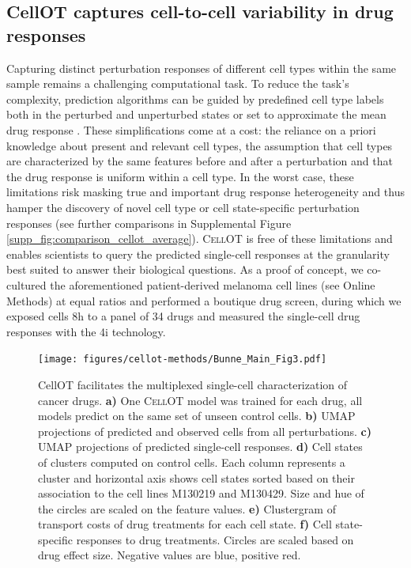 \subsection{CellOT captures cell-to-cell variability in drug responses}
Capturing distinct perturbation responses of different cell types within the same sample remains a challenging computational task. To reduce the task's complexity, prediction algorithms can be guided by predefined cell type labels both in the perturbed and unperturbed states \cite{chen2020} or set to approximate the mean drug response \cite{lotfollahi2019}.  These simplifications come at a cost: the reliance on a priori knowledge about present and relevant cell types, the assumption that cell types are characterized by the same features before and after a perturbation and that the drug response is uniform within a cell type.
In the worst case, these limitations risk masking true and important drug response heterogeneity  and thus hamper the discovery of novel cell type or cell state-specific perturbation responses (see further comparisons in Supplemental Figure \ref{supp_fig:comparison_cellot_average}).
\textsc{CellOT} is free of these limitations and enables scientists to query the predicted single-cell responses at the granularity best suited to answer their biological questions.
As a proof of concept, we co-cultured the aforementioned patient-derived melanoma cell lines (see Online Methods) at equal ratios and performed a boutique drug screen, during which we exposed cells 8h to a panel of 34 drugs and measured the single-cell drug responses with the 4i technology. 

\begin{figure}
  \begin{center}
  \texttt{[image: figures/cellot-methods/Bunne\_Main\_Fig3.pdf]}
  \end{center}
    \caption{CellOT facilitates the multiplexed single-cell characterization of cancer drugs.
    \textbf{a)} One \textsc{CellOT} model was trained for each drug, all models predict on the same set of unseen control cells.
    \textbf{b)} UMAP projections of predicted and observed cells from all perturbations.
    \textbf{c)} UMAP projections of predicted single-cell responses.
    \textbf{d)} Cell states of clusters computed on control cells. Each column represents a cluster and horizontal axis shows cell states sorted based on their association to the cell lines M130219 and M130429. Size and hue of the circles are scaled on the feature values. 
    \textbf{e)} Clustergram of transport costs of drug treatments for each cell state.
    \textbf{f)} Cell state-specific responses to drug treatments. Circles are scaled based on drug effect size. Negative values are blue, positive red.}
  \label{fig:cellot-main-4i-analysis}
\end{figure}

